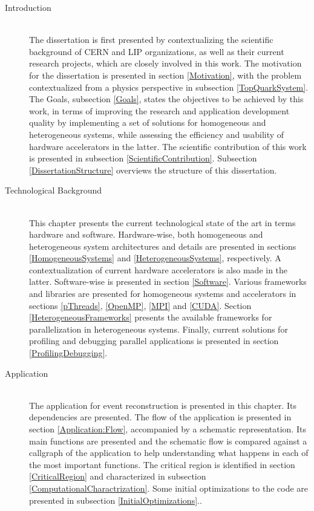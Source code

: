 \begin{description}
	\item[Introduction] \hfill \\
	The dissertation is first presented by contextualizing the scientific background of CERN and LIP organizations, as well as their current research projects, which are closely involved in this work. The motivation for the dissertation is presented in section \ref{Motivation}, with the problem contextualized from a physics perspective in subsection \ref{TopQuarkSystem}. The Goals, subsection \ref{Goals}, states the objectives to be achieved by this work, in terms of improving the research and application development quality by implementing a set of solutions for homogeneous and heterogeneous systems, while assessing the efficiency and usability of hardware accelerators in the latter. The scientific contribution of this work is presented in subsection \ref{ScientificContribution}. Subsection \ref{DissertationStructure} overviews the structure of this dissertation.
	\item[Technological Background] \hfill \\
	This chapter presents the current technological state of the art in terms hardware and software. Hardware-wise, both homogeneous and heterogeneous system architectures and details are presented in sections \ref{HomogeneousSystems} and \ref{HeterogeneousSystems}, respectively. A contextualization of current hardware accelerators is also made in the latter. Software-wise is presented in section \ref{Software}. Various frameworks and libraries are presented for homogeneous systems and accelerators in sections \ref{pThreads}, \ref{OpenMP}, \ref{MPI} and \ref{CUDA}. Section \ref{HeterogeneousFrameworks} presents the available frameworks for parallelization in heterogeneous systems. Finally, current solutions for profiling and debugging parallel applications is presented in section \ref{ProfilingDebugging}.
	\item[\tth Application] \hfill \\
	The \tth application for event reconstruction is presented in this chapter. Its dependencies are presented. The flow of the application is presented in section \ref{Application:Flow}, accompanied by a schematic representation. Its main functions are presented and the schematic flow is compared against a callgraph of the application to help understanding what happens in each of the most important functions. The critical region is identified in section \ref{CriticalRegion} and characterized in subsection \ref{ComputationalCharactrization}. Some initial optimizations to the code are presented in subsection \ref{InitialOptimizations}..
\end{description}
